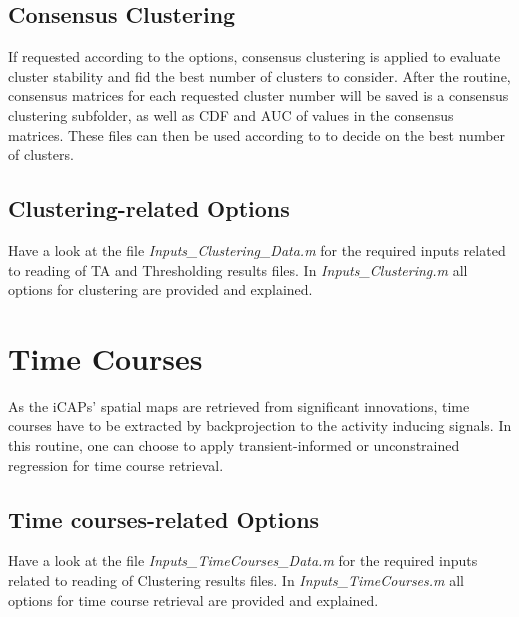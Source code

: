 \documentclass{article}
\begin{document}
\subsection{Consensus Clustering}
If requested according to the options, consensus clustering \cite{Monti2003} is applied to evaluate cluster stability and fid the best number of clusters to consider. After the routine, consensus matrices for each requested cluster number will be saved is a consensus clustering subfolder, as well as CDF and AUC of values in the consensus matrices. These files can then be used according to \cite{Monti2003} to decide on the best number of clusters.


\subsection{Clustering-related Options}
Have a look at the file \textit{Inputs\_Clustering\_Data.m} for the required inputs related to reading of TA and Thresholding results files. In \textit{Inputs\_Clustering.m} all options for clustering are provided and explained.


\section{Time Courses}
As the iCAPs' spatial maps are retrieved from significant innovations, time courses have to be extracted by backprojection to the activity inducing signals. In this routine, one can choose to apply transient-informed or unconstrained regression for time course retrieval.

\subsection{Time courses-related Options}
Have a look at the file \textit{Inputs\_TimeCourses\_Data.m} for the required inputs related to reading of Clustering results files. In \textit{Inputs\_TimeCourses.m} all options for time course retrieval are provided and explained.
\end{document}
